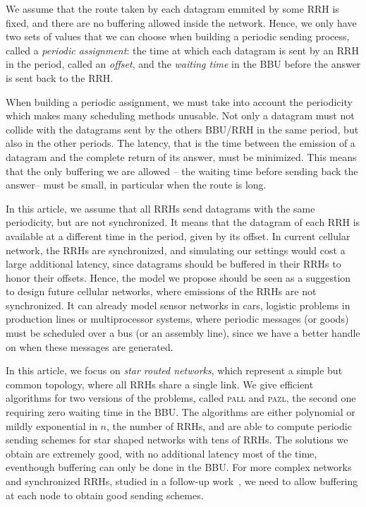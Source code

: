 \documentclass[a4paper,10pt]{journal}
\newcommand\pazl{\textsc{pazl}\xspace}
\newcommand\pall{\textsc{pall}\xspace}
\begin{document}
We assume that the route taken by each datagram emmited by some RRH is fixed, and there are no buffering allowed inside the network. Hence, we only have two sets of values that we can choose when building a periodic sending process, called a \emph{periodic assignment}: the time at which each datagram is sent by an RRH in the period, called an \emph{offset}, and the \emph{waiting time} in the BBU before the answer is sent back to the RRH. 


When building a periodic assignment, we must take into account the periodicity which makes many scheduling methods unusable. Not only a datagram must not collide with the datagrams sent by the others BBU/RRH in the same period, but also in the other periods. The latency, that is the time between the emission of a datagram and the complete return of its answer, must be minimized. This means that the only buffering we are allowed -- the waiting time before sending back the answer-- must be small, in particular when the route is long.

 In this article, we assume that all RRHs send datagrams with the same periodicity, but are not synchronized. It means that the datagram of each RRH is available at a different time in the period, given by its offset.
 In current cellular network, the RRHs are synchronized, and simulating our settings would cost a large additional latency, since datagrams should be buffered in their RRHs to honor their offsets. 
Hence, the model we propose should be seen as a suggestion to design future cellular networks, where emissions of the RRHs are not synchronized. It can already model sensor networks in cars, logistic problems in production lines or multiprocessor systems, where periodic messages (or goods) must be scheduled over a bus (or an assembly line), since we have a better handle on when these messages are generated.
 
In this article, we focus on \emph{star routed networks}, which represent a simple but common topology,
where all RRHs share a single link. We give efficient algorithms for two versions of the problems, called 
\pall and \pazl, the second one requiring zero waiting time in the BBU. The algorithms are either polynomial or mildly exponential in $n$, the number of RRHs, and are able to compute periodic sending schemes
for star shaped networks with tens of RRHs. The solutions we obtain are extremely good, with no 
additional latency most of the time, eventhough buffering can only be done in the BBU. For more complex networks and synchronized RRHs, studied in a follow-up work~\cite{guiraud2020synchronized}, we need to allow buffering at each node to obtain good sending schemes.
\end{document}
